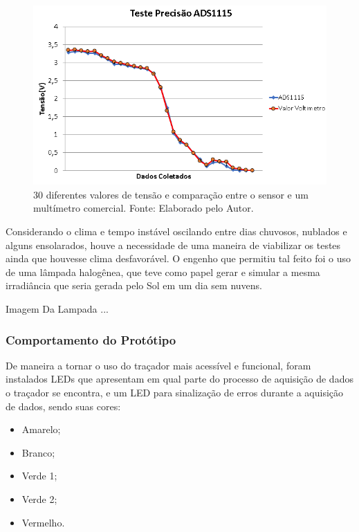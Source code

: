 \FloatBarrier
\begin{figure}[!htbp]
	\centering
	\includegraphics[scale=1.0]{imagens/Precisao}
	\caption{30 diferentes valores de tensão e comparação entre o sensor e um multímetro comercial. Fonte: Elaborado pelo Autor. 	}
	\label{fig:Precisao}
\end{figure}
\FloatBarrier

Considerando o clima e tempo instável oscilando entre dias chuvosos, nublados e alguns ensolarados, houve a necessidade de uma maneira de viabilizar os testes ainda que houvesse clima desfavorável. O engenho que permitiu tal feito foi o uso de uma lâmpada halogênea, que teve como papel gerar e simular a mesma irradiância que seria gerada pelo Sol em um dia sem nuvens.  

Imagem Da Lampada
...

\subsubsection{Comportamento do Protótipo}

De maneira a tornar o uso do traçador mais acessível e funcional, foram instalados LEDs que apresentam em qual parte do processo de aquisição de dados o traçador se encontra, e um LED para sinalização de erros durante a aquisição de dados, sendo suas cores:

\begin{itemize}
	\item Amarelo;
	\item Branco;
	\item Verde 1;
	\item Verde 2;
	\item Vermelho.
\end{itemize}

